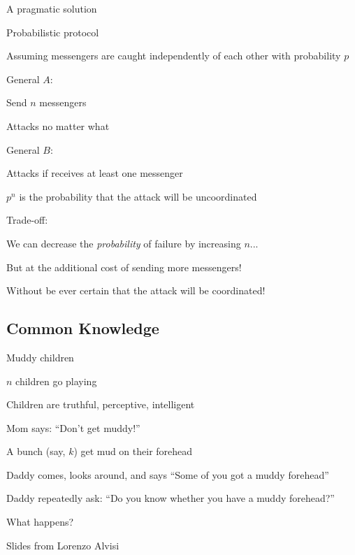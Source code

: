 \begin{frame}{A pragmatic solution}

	
	
\begin{block}{Probabilistic protocol}
\BI
\item Assuming messengers are caught independently of each other with probability $p$
\BI
\item General $A$:
\BI
  \item Send $n$ messengers
  \item Attacks no matter what
\EI
\item General $B$:
\BI
  \item Attacks if receives at least one messenger 
\EI
\EI
\item $p^n$ is the probability that the attack will be uncoordinated
\EI
\end{block}

\bigskip
Trade-off:
\BI
\item We can decrease the \emph{probability} of failure by increasing $n$...
\item But at the additional cost of sending more messengers!
\item Without be ever certain that the attack will be coordinated!
\EI
\end{frame}

\subsection{Common Knowledge}

\begin{frame}{Muddy children}
\BI
\item $n$ children go playing 
\item Children are truthful, perceptive, intelligent
\item Mom says: “Don’t get muddy!”
\item A bunch (say, $k$) get mud on their forehead
\item Daddy comes, looks around, and says “Some of you got a muddy forehead”
\item Daddy repeatedly ask: “Do you know whether you have a muddy forehead?”
\EI

\bigskip
What happens?

\bigskip
{\footnotesize Slides from Lorenzo Alvisi}
\end{frame}


